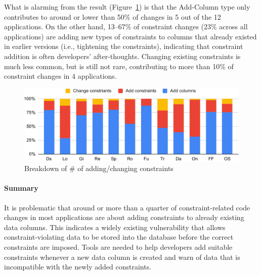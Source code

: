 

What is alarming from the result (Figure~\ref{fig:constraints-num})
is that the Add-Column type only 
contributes to around or lower than 50\% of changes in 
5 out of the %
12 applications. On the other hand, 13--67\% of constraint changes
(23\% across all applications) are adding new types of constraints to columns that already existed in earlier versions (i.e., tightening the constraints),
indicating that constraint addition is often developers' after-thoughts.
Changing existing constraints is much less common, but is still not rare, contributing to more than 10\% of constraint
changes in 4 applications.
 


\begin{figure} 
    \centering
    \includegraphics[width=0.4\columnwidth]{constraints//figs/breakdown-release.pdf}
    \caption{Breakdown of \# of adding/changing constraints 
\\   
}

    \label{fig:constraints-num}
\end{figure}


\paragraph{\bf Summary} It is problematic
that around or more than a quarter of constraint-related code changes in
most applications are about adding constraints to already existing data columns. This indicates a widely existing vulnerability that allows constraint-violating data to be stored into the database before the correct constraints are imposed. 
Tools are needed to help developers add 
suitable constraints whenever a new data column is created and 
warn of data that is incompatible with the newly added constraints.
  


